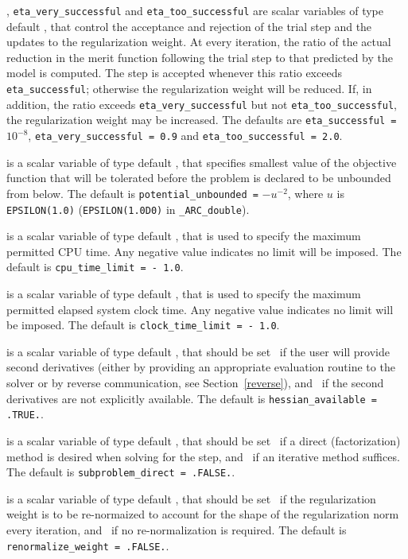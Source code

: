 \documentclass{galahad}
\newcommand{\packagename}{ARC}
\newcommand{\fullpackagename}{\libraryname\_\packagename}
\begin{document}
\begin{description}
, {\tt eta\_very\_successful}
and {\tt eta\_too\_successful}
are scalar variables of type default
\realdp, that control the acceptance and rejection of the trial step
and the updates to the regularization weight.
At every iteration, the ratio of the actual reduction in the merit function
following the trial step to that predicted by the model is computed.
The step is accepted whenever this ratio exceeds {\tt eta\_successful};
otherwise the regularization weight will be reduced.
If, in addition, the ratio exceeds {\tt eta\_very\_successful} but not
{\tt eta\_too\_successful}, the regularization weight may be increased.
The defaults are
{\tt eta\_successful =} $10^{-8}$,
{\tt eta\_very\_successful = 0.9} and
{\tt eta\_too\_successful = 2.0}.

  is a scalar variable of type default
\realdp, that specifies smallest
value of the objective function that will be tolerated before the problem
is declared to be unbounded from below.
The default is {\tt potential\_u\-nbounded =} $-u^{-2}$,
where $u$ is {\tt EPSILON(1.0)} ({\tt EPSILON(1.0D0)} in
{\tt \fullpackagename\_double}).

 is a scalar variable of type default \realdp,
that is used to specify the maximum permitted CPU time. Any negative
value indicates no limit will be imposed. The default is
{\tt cpu\_time\_limit = - 1.0}.

 is a scalar variable of type default \realdp,
that is used to specify the maximum permitted elapsed system clock time.
Any negative value indicates no limit will be imposed. The default is
{\tt clock\_time\_limit = - 1.0}.

is a scalar variable of type default \logical,
that should be set \true\ if the user will provide second derivatives
(either by providing an appropriate evaluation routine to the solver
or by reverse communication, see Section~\ref{reverse}), and
\false\ if the second derivatives are not explicitly available.
The default is {\tt hessian\_available = .TRUE.}.

is a scalar variable of type default \logical,
that should be set \true\ if a direct (factorization) method is
desired when solving for the step, and \false\ if an iterative
method suffices.
The default is {\tt subproblem\_direct = .FALSE.}.

is a scalar variable of type default \logical,
that should be set \true\ if the regularization weight is to be
re-normaized to account for the shape of the regularization norm
every iteration, and \false\ if no re-normalization is required.
The default is {\tt  renormalize\_weight = .FALSE.}.


\end{description}
\end{document}
